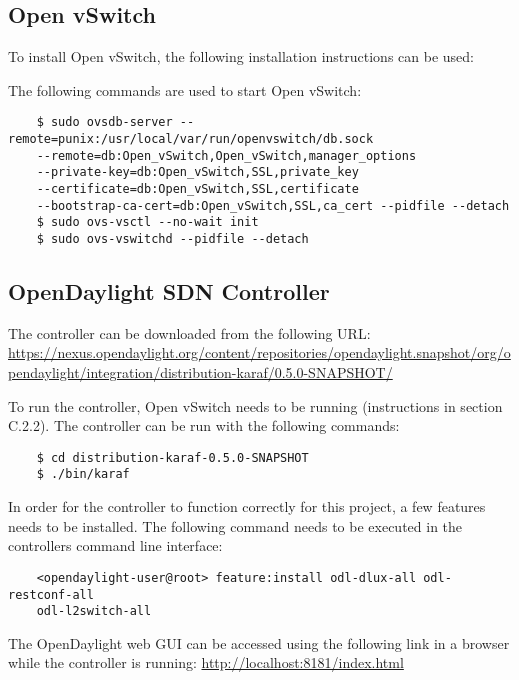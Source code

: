 \begin{appendices}
\subsection{Open vSwitch}
To install Open vSwitch, the following installation instructions can be used:
\newline
{}
\newline
\par
The following commands are used to start Open vSwitch:
\begin{verbatim}
	$ sudo ovsdb-server --remote=punix:/usr/local/var/run/openvswitch/db.sock 
	--remote=db:Open_vSwitch,Open_vSwitch,manager_options 
	--private-key=db:Open_vSwitch,SSL,private_key 
	--certificate=db:Open_vSwitch,SSL,certificate 
	--bootstrap-ca-cert=db:Open_vSwitch,SSL,ca_cert --pidfile --detach
	$ sudo ovs-vsctl --no-wait init
	$ sudo ovs-vswitchd --pidfile --detach
\end{verbatim}

\subsection{OpenDaylight SDN Controller}
The controller can be downloaded from the following URL:
\newline
\url{https://nexus.opendaylight.org/content/repositories/opendaylight.snapshot/org/opendaylight/integration/distribution-karaf/0.5.0-SNAPSHOT/}
\newline
\par
To run the controller, Open vSwitch needs to be running (instructions in section C.2.2). The controller can be run with the following commands:
\begin{verbatim}
	$ cd distribution-karaf-0.5.0-SNAPSHOT
	$ ./bin/karaf
\end{verbatim}
In order for the controller to function correctly for this project, a few features needs to be installed. The following command needs to be executed in the controllers command line interface:
\begin{verbatim}
	<opendaylight-user@root> feature:install odl-dlux-all odl-restconf-all 
	odl-l2switch-all
\end{verbatim}
The OpenDaylight web GUI can be accessed using the following link in a browser while the controller is running:
\url{http://localhost:8181/index.html}


\end{appendices}
